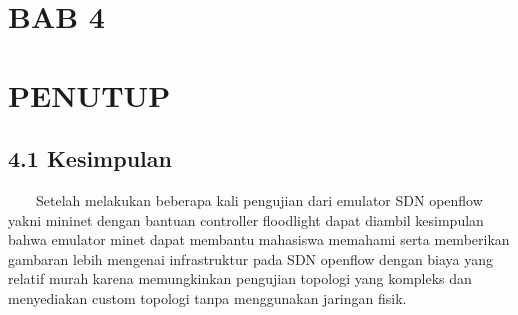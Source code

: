 \section{BAB 4}
\section{PENUTUP}
\subsection{4.1 Kesimpulan}
\ \ \ \ Setelah melakukan beberapa kali pengujian dari emulator SDN openflow yakni mininet dengan bantuan controller floodlight
dapat diambil kesimpulan bahwa emulator minet dapat membantu mahasiswa memahami serta memberikan gambaran lebih
mengenai infrastruktur pada SDN openflow dengan biaya yang relatif murah karena memungkinkan pengujian topologi yang
kompleks dan menyediakan custom topologi tanpa menggunakan jaringan fisik.
